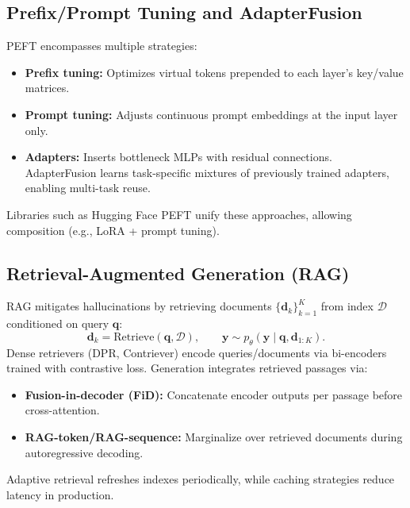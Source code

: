 \documentclass{article}
\begin{document}
\subsection{Prefix/Prompt Tuning and AdapterFusion}
PEFT encompasses multiple strategies:
\begin{itemize}
  \item \textbf{Prefix tuning:} Optimizes virtual tokens prepended to each layer's key/value matrices.
  \item \textbf{Prompt tuning:} Adjusts continuous prompt embeddings at the input layer only.
  \item \textbf{Adapters:} Inserts bottleneck MLPs with residual connections. AdapterFusion learns task-specific mixtures of previously trained adapters, enabling multi-task reuse.
\end{itemize}
Libraries such as Hugging Face PEFT unify these approaches, allowing composition (e.g., LoRA + prompt tuning).

\subsection{Retrieval-Augmented Generation (RAG)}
RAG mitigates hallucinations by retrieving documents $\{\mathbf{d}_k\}_{k=1}^{K}$ from index $\mathcal{D}$ conditioned on query $\mathbf{q}$:
\begin{equation}
  \mathbf{d}_k = \mathrm{Retrieve}(\mathbf{q}, \mathcal{D}), \qquad \mathbf{y} \sim p_{\theta}(\mathbf{y} \mid \mathbf{q}, \mathbf{d}_{1:K}).
\end{equation}
Dense retrievers (DPR, Contriever) encode queries/documents via bi-encoders trained with contrastive loss. Generation integrates retrieved passages via:
\begin{itemize}
  \item \textbf{Fusion-in-decoder (FiD):} Concatenate encoder outputs per passage before cross-attention.
  \item \textbf{RAG-token/RAG-sequence:} Marginalize over retrieved documents during autoregressive decoding.
\end{itemize}
Adaptive retrieval refreshes indexes periodically, while caching strategies reduce latency in production.
\end{document}
